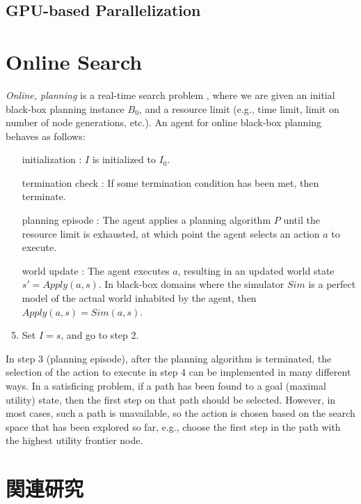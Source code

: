 \documentclass{book}
\begin{document}
\subsection{GPU-based Parallelization}


\section{Online Search}
\emph{Online, planning}  is a  real-time search  problem \cite{Korf90}, where we are given an initial black-box planning instance $B_0$, and a resource limit (e.g., time limit, limit on number of node generations, etc.).
An agent for online black-box planning behaves as follows:
\begin{enumerate}
\item [initialization]: $I$ is initialized to $I_0$.
\item [termination check]: If some termination condition has been met, then terminate.
\item [planning episode]: The agent applies a planning algorithm $P$ until the resource limit is exhausted, at which point the agent selects an action $a$ to execute.
\item [world update]: The agent executes $a$, resulting in an updated world state $s' = Apply(a,s)$. In black-box domains where the simulator $Sim$ is a perfect model of  the actual world inhabited by the agent, then $Apply(a,s) = Sim(a,s)$. 
\item Set $I= s$, and go to step 2.
\end{enumerate}

In step 3 (planning episode), after the planning algorithm is terminated, the selection of the action to execute in step 4 can be implemented in many different ways.
In a satisficing problem, if a path has been found to a goal (maximal utility) state, then the first step on that path should be selected. However, in most cases, such a path is unavailable, so the action is chosen based on the search space that has been explored so far, e.g., choose the first step in the path with the highest utility frontier node.

\section{関連研究}


\begin{comment}
\chapter{ヒューリスティック関数}
\section{ドメイン固有のヒューリスティック}
\section{緩和問題}
\end{comment}
\end{document}

